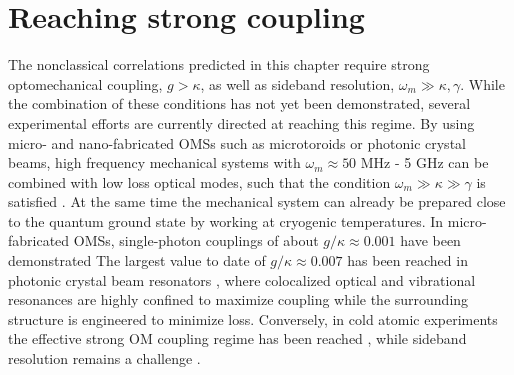 \section{Reaching strong coupling}
\label{sect:Experimental values}


The nonclassical correlations predicted in this chapter 
require  strong optomechanical coupling, $g > \kappa$, 
as well as sideband resolution, $\omega_m \gg \kappa,\gamma$. 
While the combination of these conditions has not 
yet been demonstrated, 
several experimental efforts 
are currently 
directed at reaching this regime. 
By using micro- and nano-fabricated OMSs such 
as microtoroids or photonic crystal beams, 
high frequency mechanical systems  with 
$\omega_m\approx 50$ MHz - 5 GHz can be combined 
with low loss optical modes, such that the 
condition $\omega_m \gg \kappa \gg \gamma$ is satisfied
\cite{Safavi-Naeini2011a, Schliesser2008, Eichenfield2009}.
At the same time the mechanical system can already 
be prepared close to the quantum ground state by working at cryogenic temperatures. 
In micro-fabricated OMSs, single-photon couplings of 
about $g/\kappa \approx 0.001$ have been demonstrated 
\cite{Eichenfield2009, Ding2011,Verhagen2011}
The largest value to date of $g/\kappa \approx 0.007$ 
has been reached in photonic crystal beam
resonators \cite{Chan2012}, where
colocalized optical and vibrational resonances are
highly confined to maximize coupling
while the surrounding structure is engineered  
to minimize loss.
Conversely, in cold atomic experiments
the effective strong OM coupling regime has been
reached \cite{Purdy2010}, while sideband resolution remains
a challenge \cite{Stamper-kurn}. 




